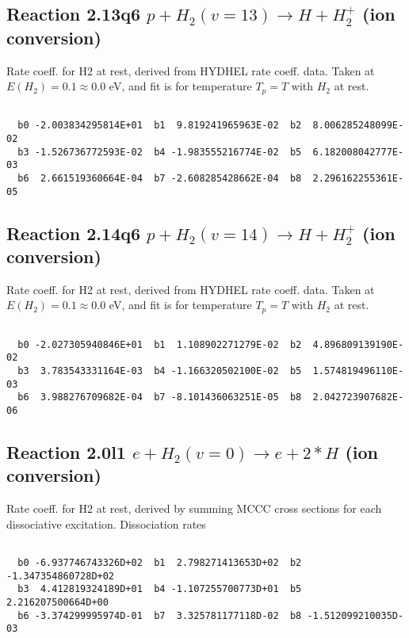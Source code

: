 \newpage
\subsection{
Reaction 2.13q6
$ p + H_2(v=13) \rightarrow H + H_2^+$ (ion conversion)
}
Rate coeff. for H2 at rest, derived from HYDHEL rate coeff. data.
Taken at $E(H_2) = 0.1 \approx 0.0$ eV,  and fit is for temperature $T_p=T$ with $H_2$ at rest.

\begin{small}\begin{verbatim}

  b0 -2.003834295814E+01  b1  9.819241965963E-02  b2  8.006285248099E-02
  b3 -1.526736772593E-02  b4 -1.983555216774E-02  b5  6.182008042777E-03
  b6  2.661519360664E-04  b7 -2.608285428662E-04  b8  2.296162255361E-05

\end{verbatim}\end{small}

\newpage
\subsection{
Reaction 2.14q6
$ p + H_2(v=14) \rightarrow H + H_2^+$ (ion conversion)
}
Rate coeff. for H2 at rest, derived from HYDHEL rate coeff. data.
Taken at $E(H_2) = 0.1 \approx 0.0$ eV,  and fit is for temperature $T_p=T$ with $H_2$ at rest.

\begin{small}\begin{verbatim}

  b0 -2.027305940846E+01  b1  1.108902271279E-02  b2  4.896809139190E-02
  b3  3.783543331164E-03  b4 -1.166320502100E-02  b5  1.574819496110E-03
  b6  3.988276709682E-04  b7 -8.101436063251E-05  b8  2.042723907682E-06

\end{verbatim}\end{small}

\newpage

\subsection{
Reaction 2.0l1
$ e + H_2(v=0) \rightarrow e + 2*H $ (ion conversion)
}
Rate coeff. for H2 at rest, derived by summing MCCC cross sections for each dissociative excitation.
Dissociation rates 

\begin{small}\begin{verbatim}

  b0 -6.937746743326D+02  b1  2.798271413653D+02  b2 -1.347354860728D+02
  b3  4.412819324189D+01  b4 -1.107255700773D+01  b5  2.216207500664D+00
  b6 -3.374299995974D-01  b7  3.325781177118D-02  b8 -1.512099210035D-03

\end{verbatim}\end{small}

